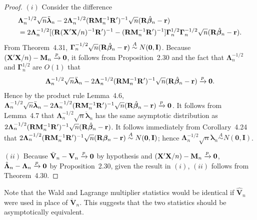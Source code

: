 \begin{proof}
$(i)$ Consider the difference
\begin{align*}
&\boldsymbol{\Lambda}_n^{-1/2}\sqrt{n}\ddot{\boldsymbol{\lambda}}_n - 2\boldsymbol{\Lambda}_n^{-1/2}(\mathbf{R}\mathbf{M}_n^{-1}\mathbf{R}')^{-1}\sqrt{n}(\mathbf{R}\hat{\boldsymbol{\beta}}_n - \mathbf{r})\\
&= 2\boldsymbol{\Lambda}_n^{-1/2}[(\mathbf{R}(\mathbf{X}'\mathbf{X}/n)^{-1}\mathbf{R}')^{-1} - (\mathbf{R}\mathbf{M}_n^{-1}\mathbf{R}')^{-1}]\boldsymbol{\Gamma}_n^{1/2}\boldsymbol{\Gamma}_n^{-1/2}\sqrt{n}(\mathbf{R}\hat{\boldsymbol{\beta}}_n - \mathbf{r}).
\end{align*}
From Theorem~4.31, $\boldsymbol{\Gamma}_n^{-1/2}\sqrt{n}(\mathbf{R}\hat{\boldsymbol{\beta}}_n - \mathbf{r}) \overset{A}{\sim} N(\mathbf{0}, \mathbf{I})$. Because $(\mathbf{X}'\mathbf{X}/n) -
\mathbf{M}_n \xrightarrow{p} \mathbf{0}$, it follows from Proposition~2.30 and the fact that $\boldsymbol{\Lambda}_n^{-1/2}$ and
$\boldsymbol{\Gamma}_n^{1/2}$ are $O(1)$ that
\[
\boldsymbol{\Lambda}_n^{-1/2}\sqrt{n}\ddot{\boldsymbol{\lambda}}_n - 2\boldsymbol{\Lambda}_n^{-1/2}(\mathbf{R}\mathbf{M}_n^{-1}\mathbf{R}')^{-1}\sqrt{n}(\mathbf{R}\hat{\boldsymbol{\beta}}_n - \mathbf{r}) \xrightarrow{p} \mathbf{0}.
\]
Hence by the product rule Lemma~4.6,
$\boldsymbol{\Lambda}_n^{-1/2}\sqrt{n}\ddot{\boldsymbol{\lambda}}_n - 2\boldsymbol{\Lambda}_n^{-1/2}(\mathbf{R}\mathbf{M}_n^{-1}\mathbf{R}')^{-1}\sqrt{n}(\mathbf{R}\hat{\boldsymbol{\beta}}_n - \mathbf{r}) \xrightarrow{p} \mathbf{0}$.
It follows from Lemma~4.7 that $\boldsymbol{\Lambda}_n^{-1/2}\sqrt{n}\ddot{\boldsymbol{\lambda}}_n$ has the same asymptotic distribution as $2\boldsymbol{\Lambda}_n^{-1/2}(\mathbf{R}\mathbf{M}_n^{-1}\mathbf{R}')^{-1}\sqrt{n}(\mathbf{R}\hat{\boldsymbol{\beta}}_n - \mathbf{r})$. It follows immediately from
Corollary~4.24 that $2\boldsymbol{\Lambda}_n^{-1/2}(\mathbf{R}\mathbf{M}_n^{-1}\mathbf{R}')^{-1}\sqrt{n}(\mathbf{R}\boldsymbol{\beta}_n - \mathbf{r}) \overset{A}{\sim} N(\mathbf{0}, \mathbf{I})$; hence
$\boldsymbol{\Lambda}_n^{-1/2}\sqrt{n}\ddot{\boldsymbol{\lambda}}_n \overset{A}{\sim} N(\mathbf{0}, \mathbf{I})$.

$(ii)$ Because $\ddot{\mathbf{V}}_n - \mathbf{V}_n \xrightarrow{p} \mathbf{0}$ by hypothesis and $(\mathbf{X}'\mathbf{X}/n) - \mathbf{M}_n \xrightarrow{p} \mathbf{0}$,
$\hat{\boldsymbol{\Lambda}}_n - \boldsymbol{\Lambda}_n \xrightarrow{p} \mathbf{0}$ by Proposition~2.30, given the result in $(i)$, $(ii)$ follows from
Theorem~4.30.
\end{proof}

Note that the Wald and Lagrange multiplier statistics would be identical
if $\hat{\mathbf{V}}_n$ were used in place of $\ddot{\mathbf{V}}_n$. This suggests that the two statistics should
be asymptotically equivalent.

